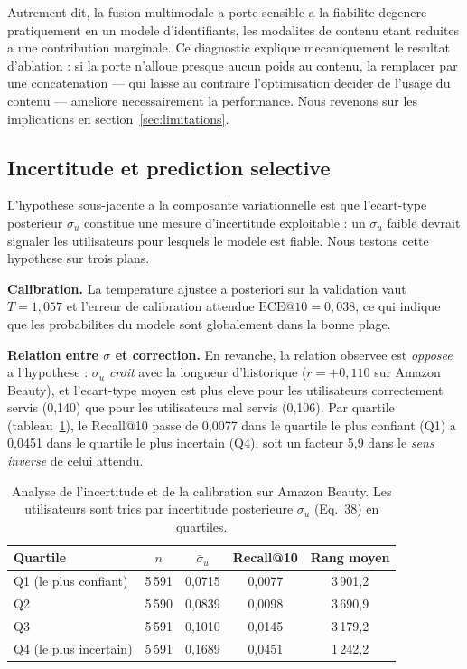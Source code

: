 Autrement dit, la fusion multimodale a porte sensible a la fiabilite degenere
pratiquement en un modele d'identifiants, les modalites de contenu etant
reduites a une contribution marginale. Ce diagnostic explique mecaniquement le
resultat d'ablation : si la porte n'alloue presque aucun poids au contenu, la
remplacer par une concatenation --- qui laisse au contraire l'optimisation
decider de l'usage du contenu --- ameliore necessairement la performance.
Nous revenons sur les implications en section~\ref{sec:limitations}.

\subsection{Incertitude et prediction selective}
\label{sec:uncertainty}

L'hypothese sous-jacente a la composante variationnelle est que l'ecart-type
posterieur $\sigma_u$ constitue une mesure d'incertitude exploitable : un
$\sigma_u$ faible devrait signaler les utilisateurs pour lesquels le modele est
fiable. Nous testons cette hypothese sur trois plans.

\textbf{Calibration.} La temperature ajustee a posteriori sur la validation
vaut $T=1{,}057$ et l'erreur de calibration attendue
$\mathrm{ECE}@10 = 0{,}038$, ce qui indique que les probabilites du modele sont
globalement dans la bonne plage.

\textbf{Relation entre $\sigma$ et correction.} En revanche, la relation
observee est \emph{opposee} a l'hypothese : $\sigma_u$ \emph{croit} avec la
longueur d'historique ($r = +0{,}110$ sur Amazon Beauty), et l'ecart-type
moyen est plus eleve pour les utilisateurs correctement servis (0,140) que pour
les utilisateurs mal servis (0,106). Par quartile
(tableau~\ref{tab:uncertainty}), le Recall@10 passe de 0,0077 dans le quartile
le plus confiant (Q1) a 0,0451 dans le quartile le plus incertain (Q4), soit un
facteur 5,9 dans le \emph{sens inverse} de celui attendu.

\begin{table}[t]
\centering
\caption{Analyse de l'incertitude et de la calibration sur Amazon Beauty. Les
utilisateurs sont tries par incertitude posterieure $\sigma_u$ (Eq.~38) en
quartiles.}
\label{tab:uncertainty}
\small
\begin{tabular}{lcccc}
\toprule
\textbf{Quartile} & \textbf{$n$} & \textbf{$\bar{\sigma}_u$} & \textbf{Recall@10} & \textbf{Rang moyen} \\
\midrule
Q1 (le plus confiant) & 5\,591 & 0,0715 & 0,0077 & 3\,901,2 \\
Q2                    & 5\,590 & 0,0839 & 0,0098 & 3\,690,9 \\
Q3                    & 5\,591 & 0,1010 & 0,0145 & 3\,179,2 \\
Q4 (le plus incertain)& 5\,591 & 0,1689 & 0,0451 & 1\,242,2 \\
\bottomrule
\end{tabular}
\end{table}

